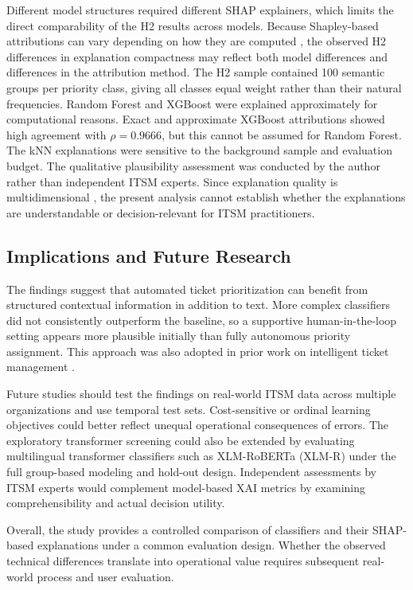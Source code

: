 Different model structures required different SHAP explainers, which limits
the direct comparability of the H2 results across models. Because
Shapley-based attributions can vary depending on how they are computed
\cite{sundararajan2020many}, the observed H2 differences in explanation
compactness may reflect both model differences and differences in the
attribution method. The H2 sample contained 100 semantic
groups per priority class, giving all classes equal weight rather than their
natural frequencies. Random Forest and XGBoost were explained approximately
for computational reasons. Exact and approximate XGBoost attributions showed
high agreement with $\rho = 0.9666$, but this cannot be assumed for Random
Forest. The kNN explanations were sensitive to the background sample and
evaluation budget. The qualitative plausibility assessment was conducted by the author rather
than independent ITSM experts. Since explanation quality is multidimensional
\cite{nauta2023evaluation}, the present analysis cannot establish whether the
explanations are understandable or decision-relevant for ITSM practitioners.

\subsection{Implications and Future Research}

The findings suggest that automated ticket prioritization can benefit from
structured contextual information in addition to text. More complex
classifiers did not consistently outperform the baseline, so a
supportive human-in-the-loop setting appears more plausible initially than
fully autonomous priority assignment. This approach was also adopted in prior work
on intelligent ticket management \cite{zicari2022ticket}.

Future studies should test the findings on real-world ITSM data across multiple
organizations and use temporal test sets. Cost-sensitive or ordinal learning
objectives could better reflect unequal operational consequences of errors.
The exploratory transformer screening could also be extended by evaluating
multilingual transformer classifiers such as XLM-RoBERTa (XLM-R) \cite{conneau2020xlmr}
under the full group-based modeling and hold-out design. Independent assessments
by ITSM experts would complement model-based XAI metrics by examining
comprehensibility and actual decision utility.

Overall, the study provides a controlled comparison of classifiers and their SHAP-based explanations under a common evaluation design. Whether the observed technical differences translate into operational value requires subsequent real-world process and user evaluation.